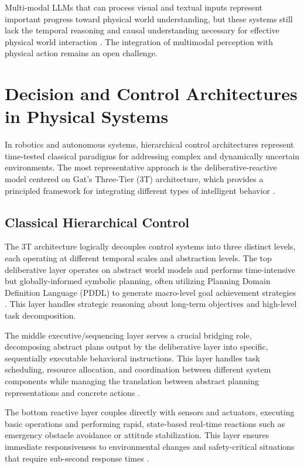 Multi-modal LLMs that can process visual and textual inputs represent important progress toward physical world understanding, but these systems still lack the temporal reasoning and causal understanding necessary for effective physical world interaction \cite{alayrac2022flamingo}. The integration of multimodal perception with physical action remains an open challenge.

\section{Decision and Control Architectures in Physical Systems}

In robotics and autonomous systems, hierarchical control architectures represent time-tested classical paradigms for addressing complex and dynamically uncertain environments. The most representative approach is the deliberative-reactive model centered on Gat's Three-Tier (3T) architecture, which provides a principled framework for integrating different types of intelligent behavior \cite{gat1998three}.

\subsection{Classical Hierarchical Control}

The 3T architecture logically decouples control systems into three distinct levels, each operating at different temporal scales and abstraction levels. The top deliberative layer operates on abstract world models and performs time-intensive but globally-informed symbolic planning, often utilizing Planning Domain Definition Language (PDDL) to generate macro-level goal achievement strategies \cite{mcdermott1998pddl}. This layer handles strategic reasoning about long-term objectives and high-level task decomposition.

The middle executive/sequencing layer serves a crucial bridging role, decomposing abstract plans output by the deliberative layer into specific, sequentially executable behavioral instructions. This layer handles task scheduling, resource allocation, and coordination between different system components while managing the translation between abstract planning representations and concrete actions \cite{simmons1995structured}.

The bottom reactive layer couples directly with sensors and actuators, executing basic operations and performing rapid, state-based real-time reactions such as emergency obstacle avoidance or attitude stabilization. This layer ensures immediate responsiveness to environmental changes and safety-critical situations that require sub-second response times \cite{brooks1986robust}.

